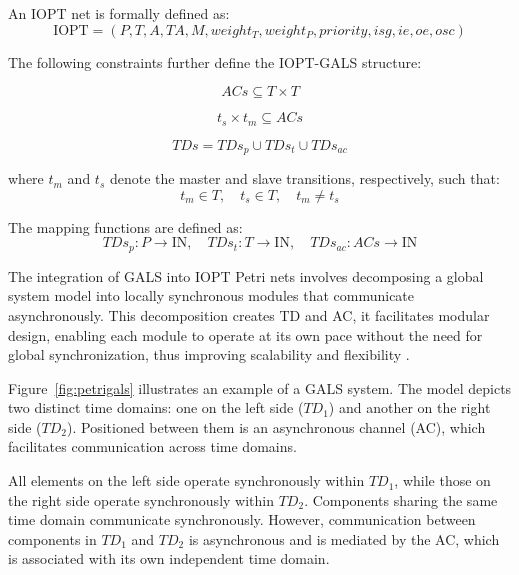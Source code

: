 An IOPT net is formally defined as:
\begin{equation}
\text{IOPT} = (P, T, A, TA, M, weight_T, weight_P, priority, isg, ie, oe, osc)
\end{equation}

The following constraints further define the IOPT-GALS structure:

\begin{equation}
ACs \subseteq T \times T
\end{equation}

\begin{equation}
t_s \times t_m \subseteq ACs
\end{equation}

\begin{equation}
TDs = TDs_p \cup TDs_t \cup TDs_{ac}
\end{equation}

\noindent where \( t_m \) and \( t_s \) denote the master and slave transitions, respectively, such that:
\[
t_m \in T, \quad t_s \in T, \quad t_m \neq t_s
\]

\noindent The mapping functions are defined as:
\[
TDs_p : P \rightarrow \text{IN}, \quad TDs_t : T \rightarrow \text{IN}, \quad TDs_{ac} : ACs \rightarrow \text{IN}
\]



The integration of GALS into IOPT Petri nets involves decomposing a global system model into locally synchronous modules that communicate asynchronously. This decomposition creates TD and AC, it facilitates modular design, enabling each module to operate at its own pace without the need for global synchronization, thus improving scalability and flexibility \cite{moutinho2011petri}.




Figure~\ref{fig:petrigals} illustrates an example of a GALS system. The model depicts two distinct time domains: one on the left side (\( TD_1 \)) and another on the right side (\( TD_2 \)). Positioned between them is an asynchronous channel (AC), which facilitates communication across time domains. 

All elements on the left side operate synchronously within \( TD_1 \), while those on the right side operate synchronously within \( TD_2 \). Components sharing the same time domain communicate synchronously. However, communication between components in \( TD_1 \) and \( TD_2 \) is asynchronous and is mediated by the AC, which is associated with its own independent time domain.




